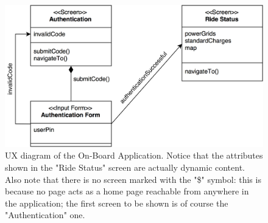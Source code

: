 \begin{figure}[H]
\begin{center}
		\includegraphics[width=\textwidth]{./user_interface_design/diagrams/on_board_ux.png}
		\caption{UX diagram of the On-Board Application. Notice that the attributes shown in the "Ride Status" screen are actually dynamic content. Also note that there is no screen marked with the "\$" symbol: this is because no page acts as a home page reachable from anywhere in the application; the first screen to be shown is of course the "Authentication" one.}
		\label{on_board_ux}
\end{center}
\end{figure}